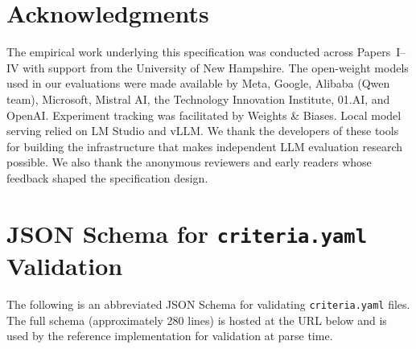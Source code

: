 \documentclass[11pt]{article}
\newcommand{\criteriayaml}{\texttt{criteria.yaml}}
\begin{document}
\section*{Acknowledgments}

The empirical work underlying this specification was conducted across Papers~I--IV with support from the University of New Hampshire. The open-weight models used in our evaluations were made available by Meta, Google, Alibaba (Qwen team), Microsoft, Mistral AI, the Technology Innovation Institute, 01.AI, and OpenAI. Experiment tracking was facilitated by Weights \& Biases. Local model serving relied on LM Studio and vLLM. We thank the developers of these tools for building the infrastructure that makes independent LLM evaluation research possible. We also thank the anonymous reviewers and early readers whose feedback shaped the specification design.






\appendix

\section{JSON Schema for \criteriayaml{} Validation}
\label{app:jsonschema}

The following is an abbreviated JSON Schema for validating \criteriayaml{} files. The full schema (approximately 280 lines) is hosted at the URL below and is used by the reference implementation for validation at parse time.
\end{document}
